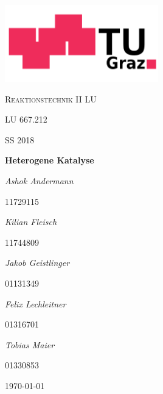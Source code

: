\documentclass[12pt,liststotoc]{report}
\begin{document}
\setcounter{secnumdepth}{5}
\setcounter{tocdepth}{5}

\begin{titlepage}
	\centering
	\includegraphics[width=0.5\textwidth]{Graphics/TU_Graz.pdf}\par\vspace{1cm}
	
	{\scshape\LARGE Reaktionstechnik II LU  \par}
	\vspace{1cm}
	{\scshape\Large LU 667.212\par}
	{\scshape \large SS 2018\par}
	\vspace{0.5cm}
	{\huge\bfseries Heterogene Katalyse \par}
	\vspace{0.5cm}

	{\LARGE \itshape Ashok Andermann\par}
	{\large 11729115\par}\vspace{0.5cm}
	
	{\LARGE \itshape Kilian Fleisch\par}
	{\large 11744809\par}\vspace{0.5cm}
	
		
	{\LARGE \itshape Jakob Geistlinger\par}
	{\large 01131349\par}\vspace{0.5cm}
	
	{\LARGE \itshape Felix Lechleitner\par}
	{\large 01316701\par}\vspace{0.5cm}

	{\LARGE \itshape Tobias Maier\par}
	{\large 01330853\par}\vspace{0.5cm}
	\vfill

	{\large \today\par}
\end{titlepage}
\end{document}
